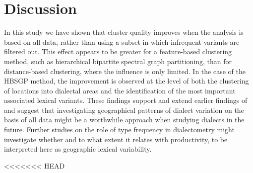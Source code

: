 \documentclass[output=paper]{LSP/langsci}
\begin{document}
\section{Discussion}
In this study we have shown that cluster quality improves when the analysis is based on all data, rather than using a subset in which infrequent variants are filtered out. This effect appears to be greater for a feature-based clustering method, such as hierarchical bipartite spectral graph partitioning, than for distance-based clustering, where the influence is only limited. In the case of the HBSGP method, the improvement is observed at the level of both the clustering of locations into dialectal areas and the identification of the most important associated lexical variants. These findings support and extend earlier findings of \citet{nerbonne_toward_2007} and suggest that investigating geographical patterns of dialect variation on the basis of all data might be a worthwhile approach when studying dialects in the future. Further studies on the role of type frequency in dialectometry might investigate whether and to what extent it relates with productivity,  to be interpreted here as geographic lexical variability.

\printbibliography[heading=subbibliography,notkeyword=this]
<<<<<<< HEAD
\end{document}
